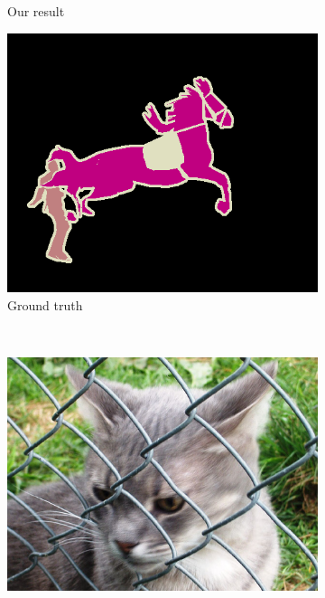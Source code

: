 \documentclass{article} %
\begin{document}
\begin{figure}[b]
\begin{subfigure}[b]{0.15\linewidth}
    \caption{Our result}
  \end{subfigure}
  \begin{subfigure}[b]{0.15\linewidth}
    \includegraphics[width=\textwidth]{figs/ab/gt/2008_004687}
    \captionsetup{labelformat=empty}
    \vspace{-0.2in}
    \caption{Ground truth}
  \end{subfigure}
  ~
  \begin{subfigure}[b]{0.15\linewidth}
    \includegraphics[width=\textwidth]{figs/ab/img/2010_005508}
    \captionsetup{labelformat=empty}
    \vspace{-0.2in}

\end{subfigure}
\end{figure}
\end{document}
